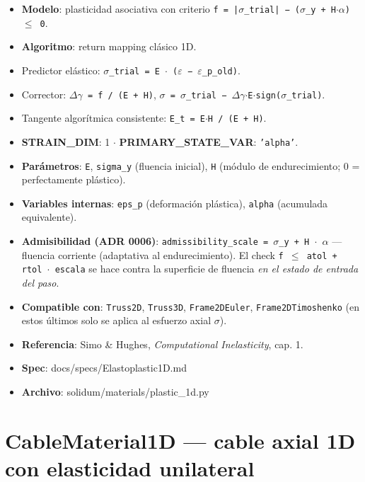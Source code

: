 \documentclass[11pt,letterpaper,oneside]{report}
\begin{document}
\begin{itemize}
  \item \textbf{Modelo}: plasticidad asociativa con criterio \texttt{f = |\ensuremath{\sigma}\_trial| − (\ensuremath{\sigma}\_y + H\ensuremath{\cdot}\ensuremath{\alpha}) \ensuremath{\le} 0}.
  \item \textbf{Algoritmo}: return mapping clásico 1D.
  \item Predictor elástico: \texttt{\ensuremath{\sigma}\_trial = E \ensuremath{\cdot} (\ensuremath{\varepsilon} − \ensuremath{\varepsilon}\_p\_old)}.
  \item Corrector: \texttt{\ensuremath{\Delta}\ensuremath{\gamma} = f / (E + H)}, \texttt{\ensuremath{\sigma} = \ensuremath{\sigma}\_trial − \ensuremath{\Delta}\ensuremath{\gamma}\ensuremath{\cdot}E\ensuremath{\cdot}sign(\ensuremath{\sigma}\_trial)}.
  \item Tangente algorítmica consistente: \texttt{E\_t = E\ensuremath{\cdot}H / (E + H)}.
  \item \textbf{STRAIN\_DIM}: 1 \ensuremath{\cdot} \textbf{PRIMARY\_STATE\_VAR}: \texttt{'alpha'}.
  \item \textbf{Parámetros}: \texttt{E}, \texttt{sigma\_y} (fluencia inicial), \texttt{H} (módulo de endurecimiento; 0 = perfectamente plástico).
  \item \textbf{Variables internas}: \texttt{eps\_p} (deformación plástica), \texttt{alpha} (acumulada equivalente).
  \item \textbf{Admisibilidad (ADR 0006)}: \texttt{admissibility\_scale = \ensuremath{\sigma}\_y + H \ensuremath{\cdot} \ensuremath{\alpha}} --- fluencia corriente (adaptativa al endurecimiento). El check \texttt{f \ensuremath{\le} atol + rtol \ensuremath{\cdot} escala} se hace contra la superficie de fluencia \textit{en el estado de entrada del paso}.
  \item \textbf{Compatible con}: \texttt{Truss2D}, \texttt{Truss3D}, \texttt{Frame2DEuler}, \texttt{Frame2DTimoshenko} (en estos últimos solo se aplica al esfuerzo axial $\sigma$).
  \item \textbf{Referencia}: Simo \& Hughes, \textit{Computational Inelasticity}, cap. 1.
  \item \textbf{Spec}: docs/specs/Elastoplastic1D.md
  \item \textbf{Archivo}: solidum/materials/plastic\_1d.py
\end{itemize}


\section{CableMaterial1D --- cable axial 1D con elasticidad unilateral}
\end{document}
